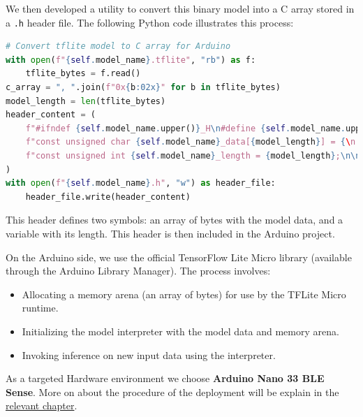 We then developed a utility to convert this binary model into a C array stored in a \texttt{.h} header file. The following Python code illustrates this process:

\begin{lstlisting}[language=Python, caption={Convert a TFLite model to a C header array for Arduino deployment}, label=lst:tflite_to_c_array]
# Convert tflite model to C array for Arduino
with open(f"{self.model_name}.tflite", "rb") as f:
    tflite_bytes = f.read()
c_array = ", ".join(f"0x{b:02x}" for b in tflite_bytes)
model_length = len(tflite_bytes)
header_content = (
    f"#ifndef {self.model_name.upper()}_H\n#define {self.model_name.upper()}_H\n\n"
    f"const unsigned char {self.model_name}_data[{model_length}] = {\n    {c_array}\n}};\n"
    f"const unsigned int {self.model_name}_length = {model_length};\n\n#endif"
)
with open(f"{self.model_name}.h", "w") as header_file:
    header_file.write(header_content)
\end{lstlisting}

This header defines two symbols: an array of bytes with the model data, and a variable with its length. This header is then included in the Arduino project.

On the Arduino side, we use the official TensorFlow Lite Micro library (available through the Arduino Library Manager). The process involves:

\begin{itemize}
    \item Allocating a memory arena (an array of bytes) for use by the TFLite Micro runtime.
    \item Initializing the model interpreter with the model data and memory arena.
    \item Invoking inference on new input data using the interpreter.
\end{itemize}


As a targeted Hardware environment we choose \textbf{Arduino Nano 33 BLE Sense}. More on about the procedure of the deployment will be explain in the  \hyperref[chap:DeploymentEnvironment]{relevant chapter}.


